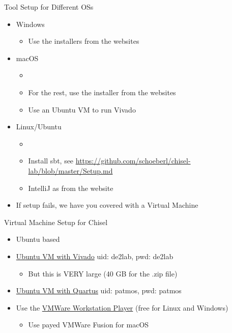 \begin{frame}[fragile]{Tool Setup for Different OSs}
\begin{itemize}
\item Windows
\begin{itemize}
\item Use the installers from the websites
\end{itemize}
\item macOS
\begin{itemize}
\item {}
\item For the rest, use the installer from the websites
\item Use an Ubuntu VM to run Vivado
\end{itemize}
\item Linux/Ubuntu
\begin{itemize}
\item {}
\item Install sbt, see \url{https://github.com/schoeberl/chisel-lab/blob/master/Setup.md}
\item IntelliJ as from the website
\end{itemize}
\item If setup fails, we have you covered with a Virtual Machine
\end{itemize}
\end{frame}

\begin{frame}[fragile]{Virtual Machine Setup for Chisel}
\begin{itemize}
\item Ubuntu based
\item \href{https://patmos-download.compute.dtu.dk/de2lab.zip}{Ubuntu VM with Vivado} uid: de2lab, pwd: de2lab
\begin{itemize}
\item But this is VERY large (40 GB for the .zip file)
\end{itemize}
\item \href{http://patmos.compute.dtu.dk/patmos-dev.zip}{Ubuntu VM with Quartus} uid: patmos, pwd: patmos
\item Use the  \href{https://www.vmware.com/products/workstation-player.html} {VMWare Workstation Player} (free for Linux and Windows)
\begin{itemize}
\item Use payed VMWare Fusion for macOS
\end{itemize}
\end{itemize}
\end{frame}

